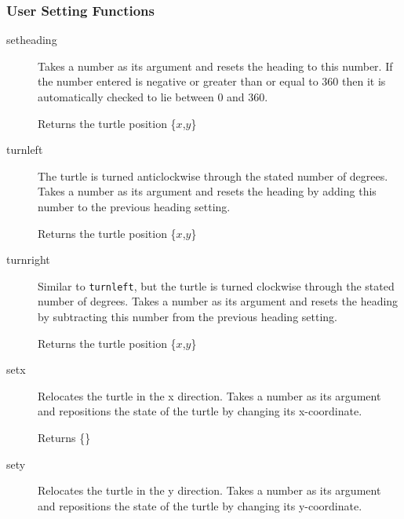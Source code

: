 \subsubsection{User Setting Functions}
\begin{description}
\item[setheading]
  Takes a number as its argument and resets the heading
       to this number. If the number entered is negative or greater than
       or equal to 360 then it is automatically checked to lie between 0
       and 360.

       Returns the turtle position \{$x$,$y$\}


     \item[turnleft]
       The turtle is turned anticlockwise through the
       stated number of degrees. Takes a number as its argument and
       resets the heading by adding this number to the previous heading
       setting.

       Returns the turtle position \{$x$,$y$\}


     \item[turnright]
       Similar to \texttt{turnleft}, but the turtle is turned
       clockwise through the stated number of degrees. Takes a number as
       its argument and resets the heading by subtracting this number from
       the previous heading setting.

       Returns the turtle position \{$x$,$y$\}


     \item[setx]
       Relocates the turtle in the x direction. Takes a number as
       its argument and repositions the state of the turtle by changing its
       x-coordinate.

       Returns \{\}


     \item[sety]
       Relocates the turtle in the y direction. Takes a number as
       its argument and repositions the state of the turtle by changing its
       y-coordinate.


\end{description}
